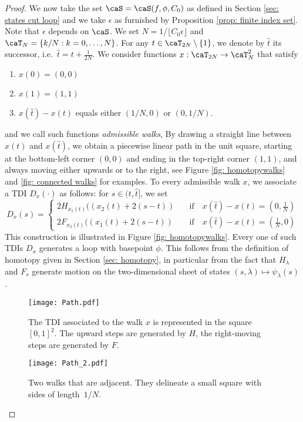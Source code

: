 \begin{proof}
	We now take the set $\caS=\caS(f,\phi,C_0)$ as defined in Section \ref{sec: states cut loop} and we take $\epsilon$ as furnished by Proposition \ref{prop: finite index set}. Note that $\epsilon$ depends on $\caS$.
	We set $N=1/\lfloor C_0\epsilon\rfloor$ and $\caT_N=\{k/N:k=0,\ldots,N\}$. For any $t\in\caT_{2N} \setminus \{1\}$, we denote by $\hat{t}$ its successor, i.e.\ $\hat{t}=t+\tfrac{1}{2N}$.
	We consider functions $x: \caT_{2N} \to \caT_{N}^2 $ that satisfy
	\begin{enumerate}
		\item $x(0)=(0,0)$
		\item $x(1)=(1,1)$
		\item $x(\hat{t})-x(t)$ equals either $(1/N,0)$ or $(0,1/N)$.
	\end{enumerate}  
	and we call such functions \emph{admissible walks}, 
	By drawing a straight line between $x(t)$ and $x(\hat{t})$, we obtain a piecewise linear path in the unit square, starting at the bottom-left corner $(0,0)$ and ending in the top-right corner $(1,1)$, and always moving either upwards or to the right, see Figure \ref{fig: homotopywalks} and  \ref{fig: connected walks} for examples.
	To every admissible walk $x$, we associate a TDI $D_x(\cdot)$ as follows: for $s\in (t,\hat{t}]$, we set 
	\begin{equation}
	D_x(s)= 
	\begin{cases}
	2H_{x_1(t)} ((x_2(t)+2(s-t)) &  \quad \text{if} \quad   x(\hat{t})-x(t)= (0,\tfrac{1}{N})   \\[1mm]
	2F_{x_2(t)} ((x_1(t)+2(s-t)) &  \quad \text{if} \quad  x(\hat{t})-x(t)= (\tfrac{1}{N},0)   
	\end{cases}
	\end{equation}
	This construction is illustrated in Figure \ref{fig: homotopywalks}. Every one of such TDIs $D_x$ generates a loop with basepoint $\phi$. This follows from the definition of homotopy given in Section \ref{sec: homotopy}, in particular from the fact that $H_\lambda$ and $F_s$ generate motion on the two-dimensional sheet of states $(s,\lambda)\mapsto\psi_\lambda(s)$.
	
	\begin{figure}
		\centering
		\begin{minipage}{0.475\textwidth}
			\centering
			\texttt{[image: Path.pdf]}
			\caption{The TDI associated to the walk $x$ is represented in the square $[0,1]^2$. The upward steps are generated by $H$, the right-moving steps are generated by $F$.}
			\label{fig: homotopywalks}
		\end{minipage}\hfill
		\begin{minipage}{0.475\textwidth}
			\centering
			\texttt{[image: Path\_2.pdf]}
			\caption{Two walks that are adjacent. They delineate a small square with sides of length~$1/N$.  }
			\label{fig: adjacentpaths}
		\end{minipage}
	\end{figure}
	

\end{proof}
